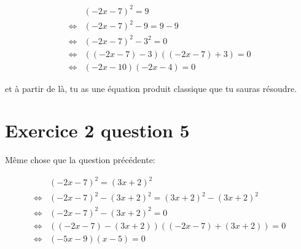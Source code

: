 \begin{align*}
    & (-2x-7)^2=9\\
    \iff & (-2x-7)^2 -9=9-9\\
    \iff & (-2x-7)^2 -3^2=0\\
    \iff & ((-2x-7)-3)((-2x-7)+3)=0\\
    \iff & (-2x-10)(-2x-4)=0
\end{align*}

et à partir de là, tu as une équation produit classique que tu sauras résoudre.

\section*{Exercice 2 question 5}

Même chose que la question précédente:

\begin{align*}
    & (-2x-7)^2=(3x+2)^2\\
    \iff & (-2x-7)^2 -(3x+2)^2=(3x+2)^2-(3x+2)^2\\
    \iff & (-2x-7)^2 -(3x+2)^2=0\\
    \iff & ((-2x-7)-(3x+2))((-2x-7)+(3x+2))=0\\
    \iff & (-5x-9)(x-5)=0
\end{align*}
